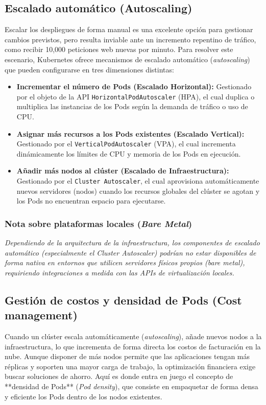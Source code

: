 \subsection{Escalado automático (Autoscaling)}

Escalar los despliegues de forma manual es una excelente opción para gestionar cambios previstos, pero resulta inviable ante un incremento repentino de tráfico, como recibir 10,000 peticiones web nuevas por minuto. Para resolver este escenario, Kubernetes ofrece mecanismos de escalado automático (\textit{autoscaling}) que pueden configurarse en tres dimensiones distintas:

\begin{itemize}
    \item \textbf{Incrementar el número de Pods (Escalado Horizontal):} Gestionado por el objeto de la API \texttt{HorizontalPodAutoscaler} (HPA), el cual duplica o multiplica las instancias de los Pods según la demanda de tráfico o uso de CPU.
    \item \textbf{Asignar más recursos a los Pods existentes (Escalado Vertical):} Gestionado por el \texttt{VerticalPodAutoscaler} (VPA), el cual incrementa dinámicamente los límites de CPU y memoria de los Pods en ejecución.
    \item \textbf{Añadir más nodos al clúster (Escalado de Infraestructura):} Gestionado por el \texttt{Cluster Autoscaler}, el cual aprovisiona automáticamente nuevos servidores (nodos) cuando los recursos globales del clúster se agotan y los Pods no encuentran espacio para ejecutarse.
\end{itemize}

\subsubsection*{Nota sobre plataformas locales (\textit{Bare Metal})}
\textit{Dependiendo de la arquitectura de la infraestructura, los componentes de escalado automático (especialmente el \textit{Cluster Autoscaler}) podrían no estar disponibles de forma nativa en entornos que utilicen servidores físicos propios (\textit{bare metal}), requiriendo integraciones a medida con las APIs de virtualización locales.}

\subsection{Gestión de costos y densidad de Pods (Cost management)}

Cuando un clúster escala automáticamente (\textit{autoscaling}), añade nuevos nodos a la infraestructura, lo que incrementa de forma directa los costos de facturación en la nube. Aunque disponer de más nodos permite que las aplicaciones tengan más réplicas y soporten una mayor carga de trabajo, la optimización financiera exige buscar soluciones de ahorro. Aquí es donde entra en juego el concepto de **densidad de Pods** (\textit{Pod density}), que consiste en empaquetar de forma densa y eficiente los Pods dentro de los nodos existentes.


